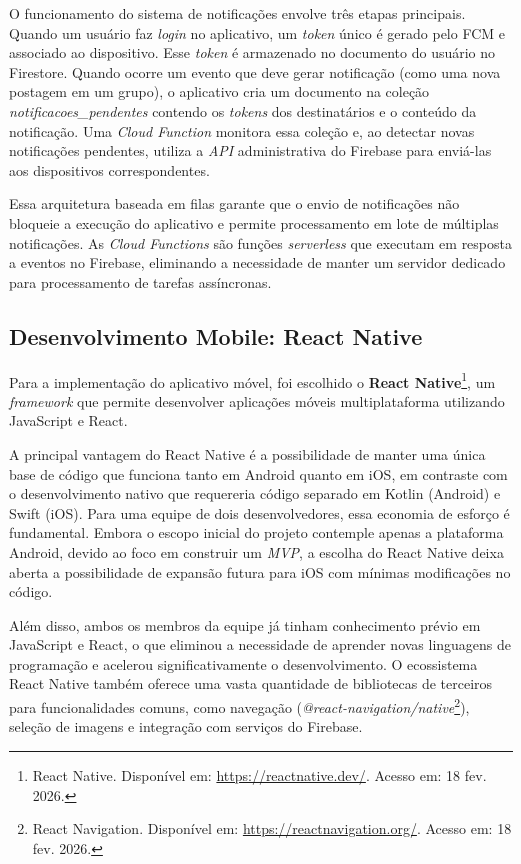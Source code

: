 O funcionamento do sistema de notificações envolve três etapas principais. Quando um usuário faz \textit{login} no aplicativo, um \textit{token} único é gerado pelo FCM e associado ao dispositivo. Esse \textit{token} é armazenado no documento do usuário no Firestore. Quando ocorre um evento que deve gerar notificação (como uma nova postagem em um grupo), o aplicativo cria um documento na coleção \textit{notificacoes\_pendentes} contendo os \textit{tokens} dos destinatários e o conteúdo da notificação. Uma \textit{Cloud Function} monitora essa coleção e, ao detectar novas notificações pendentes, utiliza a \textit{API} administrativa do Firebase para enviá-las aos dispositivos correspondentes.

Essa arquitetura baseada em filas garante que o envio de notificações não bloqueie a execução do aplicativo e permite processamento em lote de múltiplas notificações. As \textit{Cloud Functions} são funções \textit{serverless} que executam em resposta a eventos no Firebase, eliminando a necessidade de manter um servidor dedicado para processamento de tarefas assíncronas.

\subsection{Desenvolvimento Mobile: React Native}

Para a implementação do aplicativo móvel, foi escolhido o \textbf{React Native}\footnote{React Native. Disponível em: \url{https://reactnative.dev/}. Acesso em: 18 fev. 2026.}, um \textit{framework} que permite desenvolver aplicações móveis multiplataforma utilizando JavaScript e React.

A principal vantagem do React Native é a possibilidade de manter uma única base de código que funciona tanto em Android quanto em iOS, em contraste com o desenvolvimento nativo que requereria código separado em Kotlin (Android) e Swift (iOS). Para uma equipe de dois desenvolvedores, essa economia de esforço é fundamental. Embora o escopo inicial do projeto contemple apenas a plataforma Android, devido ao foco em construir um \textit{MVP}, a escolha do React Native deixa aberta a possibilidade de expansão futura para iOS com mínimas modificações no código.

Além disso, ambos os membros da equipe já tinham conhecimento prévio em JavaScript e React, o que eliminou a necessidade de aprender novas linguagens de programação e acelerou significativamente o desenvolvimento. O ecossistema React Native também oferece uma vasta quantidade de bibliotecas de terceiros para funcionalidades comuns, como navegação (\textit{@react-navigation/native}\footnote{React Navigation. Disponível em: \url{https://reactnavigation.org/}. Acesso em: 18 fev. 2026.}), seleção de imagens e integração com serviços do Firebase.

